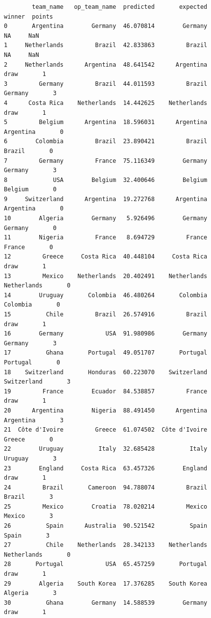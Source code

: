\documentclass[12pt,fleqn]{article}\usepackage{common}
\begin{document}
\begin{verbatim}
        team_name   op_team_name  predicted       expected         winner  points
0       Argentina        Germany  46.070814        Germany             NA     NaN
1     Netherlands         Brazil  42.833863         Brazil             NA     NaN
2     Netherlands      Argentina  48.641542      Argentina           draw       1
3         Germany         Brazil  44.011593         Brazil        Germany       3
4      Costa Rica    Netherlands  14.442625    Netherlands           draw       1
5         Belgium      Argentina  18.596031      Argentina      Argentina       0
6        Colombia         Brazil  23.890421         Brazil         Brazil       0
7         Germany         France  75.116349        Germany        Germany       3
8             USA        Belgium  32.400646        Belgium        Belgium       0
9     Switzerland      Argentina  19.272768      Argentina      Argentina       0
10        Algeria        Germany   5.926496        Germany        Germany       0
11        Nigeria         France   8.694729         France         France       0
12         Greece     Costa Rica  40.448104     Costa Rica           draw       1
13         Mexico    Netherlands  20.402491    Netherlands    Netherlands       0
14        Uruguay       Colombia  46.480264       Colombia       Colombia       0
15          Chile         Brazil  26.574916         Brazil           draw       1
16        Germany            USA  91.980986        Germany        Germany       3
17          Ghana       Portugal  49.051707       Portugal       Portugal       0
18    Switzerland       Honduras  60.223070    Switzerland    Switzerland       3
19         France        Ecuador  84.538857         France           draw       1
20      Argentina        Nigeria  88.491450      Argentina      Argentina       3
21  Côte d'Ivoire         Greece  61.074502  Côte d'Ivoire         Greece       0
22        Uruguay          Italy  32.685428          Italy        Uruguay       3
23        England     Costa Rica  63.457326        England           draw       1
24         Brazil       Cameroon  94.788074         Brazil         Brazil       3
25         Mexico        Croatia  78.020214         Mexico         Mexico       3
26          Spain      Australia  90.521542          Spain          Spain       3
27          Chile    Netherlands  28.342133    Netherlands    Netherlands       0
28       Portugal            USA  65.457259       Portugal           draw       1
29        Algeria    South Korea  17.376285    South Korea        Algeria       3
30          Ghana        Germany  14.588539        Germany           draw       1

\end{verbatim}
\end{document}
